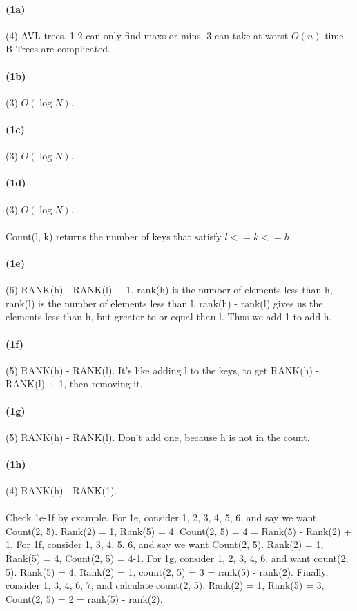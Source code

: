 \documentclass{article}
\begin{document}
\paragraph{(1a)}
(4) AVL trees. 1-2 can only find maxs or mins. 3 can take at worst $O(n)$ time. B-Trees are complicated.

\paragraph{(1b)}
(3) $O(\log N)$.

\paragraph{(1c)}
(3) $O(\log N)$.

\paragraph{(1d)}
(3) $O(\log N)$.

\paragraph{}
Count(l, k) returns the number of keys that satisfy $l <= k <= h$.
\paragraph{(1e)}
(6) RANK(h) - RANK(l) + 1. rank(h) is the number of elements less than h, rank(l) is the number of elements less than l. rank(h) - rank(l) gives us the elements less than h, but greater to or equal than l. Thus we add 1 to add h.

\paragraph{(1f)}
(5) RANK(h) - RANK(l). It's like adding l to the keys, to get RANK(h) - RANK(l) + 1, then removing it.

\paragraph{(1g)}
(5) RANK(h) - RANK(l). Don't add one, because h is not in the count.

\paragraph{(1h)}
(4) RANK(h) - RANK(1).

\paragraph{}
Check 1e-1f by example. For 1e, consider 1, 2, 3, 4, 5, 6, and say we want Count(2, 5). Rank(2) = 1, Rank(5) = 4. Count(2, 5) = 4 = Rank(5) - Rank(2) + 1.
For 1f, consider 1, 3, 4, 5, 6, and say we want Count(2, 5). Rank(2) = 1, Rank(5) = 4, Count(2, 5) = 4-1. For 1g, consider 1, 2, 3, 4, 6, and want count(2, 5).
Rank(5) = 4, Rank(2) = 1, count(2, 5) = 3 = rank(5) - rank(2). Finally, consider 1, 3, 4, 6, 7, and calculate count(2, 5). Rank(2) = 1, Rank(5) = 3, Count(2, 5) = 2
= rank(5) - rank(2).
\end{document}

